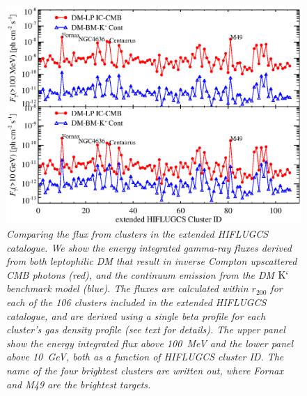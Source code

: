 \documentclass[10pt,aps,pra,reprint,amsmath,amsfonts,amssymb,showpacs]{revtex4-1}
\newcommand{\rmn}{\mathrm}
\newcommand{\rvir}{r_{200}}
\newcommand{\Km}{\rmn{K}`}
\begin{document}
\begin{figure}%
\begin{minipage}{2.0\columnwidth}
 \includegraphics[width=0.99\columnwidth]{figures/Flux.comp.DM.eps}
\caption{\it Comparing the flux from clusters in the extended HIFLUGCS
  catalogue. We show the energy integrated gamma-ray fluxes derived
  from both leptophilic DM that result in inverse Compton upscattered
  CMB photons (red), and the continuum emission from the DM $\Km$
  benchmark model (blue). The fluxes are calculated within $\rvir$
  for each of the 106 clusters included in the extended HIFLUGCS
  catalogue, and are derived using a single beta profile for each
  cluster's gas density profile (see text for details). The upper
  panel show the energy integrated flux above 100~MeV and the lower
  panel above 10~GeV, both as a function of HIFLUGCS cluster ID. The
  name of the four brightest clusters are written out, where Fornax
  and M49 are the brightest targets.}
 \label{fig21}
\end{minipage}
\end{figure}
\end{document}
